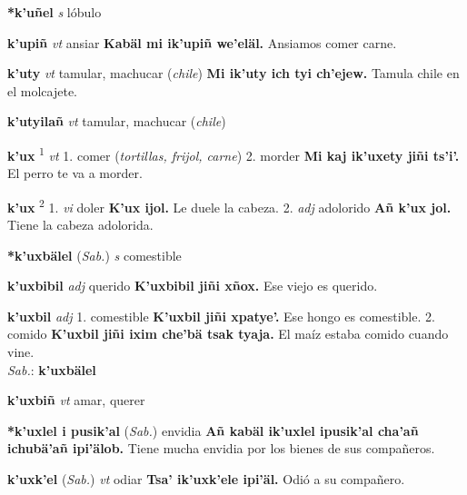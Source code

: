 \documentclass[10pt]{scrbook}
\newcommand{\entry}[1]{\textbf{#1}}
\newcommand{\onedefinition}[1]{#1.}
\newcommand{\defsuperscript}[1]{\textsuperscript{#1}}
\newcommand{\partofspeech}[1]{\textit{#1}}
\newcommand{\spanishtranslation}[1]{#1}
\newcommand{\clarification}[1]{(\textit{#1})}
\newcommand{\cholexample}[1]{\textbf{#1}}
\newcommand{\exampletranslation}[1]{#1}
\newcommand{\dialectvariant}[1]{\\\textit{#1}:}
\newcommand{\dialectword}[1]{\textbf{#1}}
\newcommand{\relevantdialect}[1]{(\textit{#1})}
\begin{document}
\begin{multicols}{2}
\entry{*k'uñel}
\partofspeech{s}
\spanishtranslation{lóbulo}

\entry{k'upiñ}
\partofspeech{vt}
\spanishtranslation{ansiar}
\cholexample{Kabäl mi ik'upiñ we'eläl.}
\exampletranslation{Ansiamos comer carne.}

\entry{k'uty}
\partofspeech{vt}
\spanishtranslation{tamular, machucar}
\clarification{chile}
\cholexample{Mi ik'uty ich tyi ch'ejew.}
\exampletranslation{Tamula chile en el molcajete.}

\entry{k'utyilañ}
\partofspeech{vt}
\spanishtranslation{tamular, machucar}
\clarification{chile}

\entry{k'ux}
\defsuperscript{1}
\partofspeech{vt}
\onedefinition{1}
\spanishtranslation{comer}
\clarification{tortillas, frijol, carne}
\onedefinition{2}
\spanishtranslation{morder}
\cholexample{Mi kaj ik'uxety jiñi ts'i'.}
\exampletranslation{El perro te va a morder.}

\entry{k'ux}
\defsuperscript{2}
\onedefinition{1}
\partofspeech{vi}
\spanishtranslation{doler}
\cholexample{K'ux ijol.}
\exampletranslation{Le duele la cabeza.}
\onedefinition{2}
\partofspeech{adj}
\spanishtranslation{adolorido}
\cholexample{Añ k'ux jol.}
\exampletranslation{Tiene la cabeza adolorida.}

\entry{*k'uxbälel}
\relevantdialect{Sab.}
\partofspeech{s}
\spanishtranslation{comestible}

\entry{k'uxbibil}
\partofspeech{adj}
\spanishtranslation{querido}
\cholexample{K'uxbibil jiñi xñox.}
\exampletranslation{Ese viejo es querido.}

\entry{k'uxbil}
\partofspeech{adj}
\onedefinition{1}
\spanishtranslation{comestible}
\cholexample{K'uxbil jiñi xpatye'.}
\exampletranslation{Ese hongo es comestible.}
\onedefinition{2}
\spanishtranslation{comido}
\cholexample{K'uxbil jiñi ixim che'bä tsak tyaja.}
\exampletranslation{El maíz estaba comido cuando vine.}
\dialectvariant{Sab.}
\dialectword{k'uxbälel}

\entry{k'uxbiñ}
\partofspeech{vt}
\spanishtranslation{amar, querer}

\entry{*k'uxlel i pusik'al}
\relevantdialect{Sab.}
\spanishtranslation{envidia}
\cholexample{Añ kabäl ik'uxlel ipusik'al cha'añ ichubä'añ ipi'älob.}
\exampletranslation{Tiene mucha envidia por los bienes de sus compañeros.}

\entry{k'uxk'el}
\relevantdialect{Sab.}
\partofspeech{vt}
\spanishtranslation{odiar}
\cholexample{Tsa' ik'uxk'ele ipi'äl.}
\exampletranslation{Odió a su compañero.}


\end{multicols}
\end{document}

